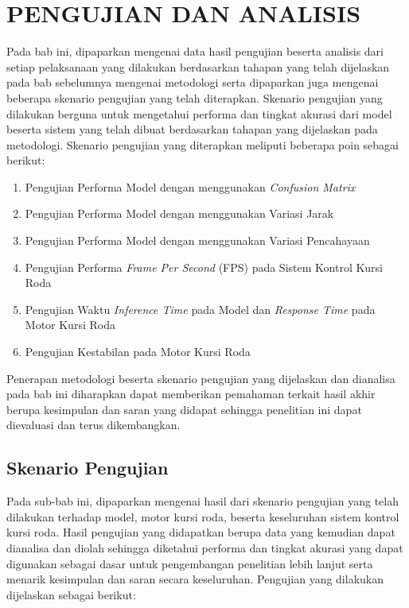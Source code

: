 \chapter{PENGUJIAN DAN ANALISIS}
\label{chap:pengujiananalisis}


Pada bab ini, dipaparkan mengenai data hasil pengujian beserta analisis dari setiap pelaksanaan yang dilakukan berdasarkan tahapan yang telah dijelaskan pada bab sebelumnya mengenai metodologi serta dipaparkan juga mengenai beberapa skenario pengujian yang telah diterapkan. Skenario pengujian yang dilakukan berguna untuk mengetahui performa dan tingkat akurasi dari model beserta sistem yang telah dibuat berdasarkan tahapan yang dijelaskan pada metodologi. Skenario pengujian yang diterapkan meliputi beberapa poin sebagai berikut:

\begin{enumerate}[topsep=8pt,itemsep=4pt,partopsep=4pt, parsep=4pt]
  \item Pengujian Performa Model dengan menggunakan \emph{Confusion Matrix}
  \item Pengujian Performa Model dengan menggunakan Variasi Jarak
  \item Pengujian Performa Model dengan menggunakan Variasi Pencahayaan
  \item Pengujian Performa \emph{Frame Per Second} (FPS) pada Sistem Kontrol Kursi Roda
  \item Pengujian Waktu \emph{Inference Time} pada Model dan \emph{Response Time} pada Motor Kursi Roda
  \item Pengujian Kestabilan pada Motor Kursi Roda
\end{enumerate}

Penerapan metodologi beserta skenario pengujian yang dijelaskan dan dianalisa pada bab ini diharapkan dapat memberikan pemahaman terkait hasil akhir berupa kesimpulan dan saran yang didapat sehingga penelitian ini dapat dievaluasi dan terus dikembangkan.

\section{Skenario Pengujian}
\label{sec:skenariopengujian}

Pada sub-bab ini, dipaparkan mengenai hasil dari skenario pengujian yang telah dilakukan terhadap model, motor kursi roda, beserta keseluruhan sistem kontrol kursi roda. Hasil pengujian yang didapatkan berupa data yang kemudian dapat dianalisa dan diolah sehingga diketahui performa dan tingkat akurasi yang dapat digunakan sebagai dasar untuk pengembangan penelitian lebih lanjut serta menarik kesimpulan dan saran secara keseluruhan. Pengujian yang dilakukan dijelaskan sebagai berikut:

